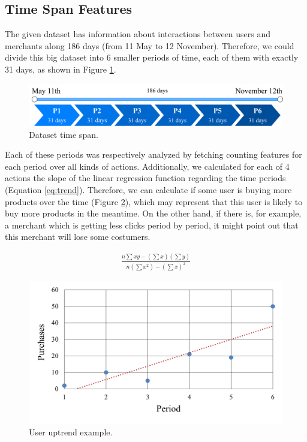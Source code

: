 \documentclass{article}
\begin{document}
\subsection{Time Span Features}

The given dataset has information about interactions between users and merchants along 186 days (from 11 May to 12 November). Therefore, we could divide this big dataset into 6 smaller periods of time, each of them with exactly 31 days, as shown in Figure \ref{fig:time}.

\begin{figure}[h!]
    \centering
    \includegraphics[width=0.9\linewidth]{figs/time.png}
    \vspace{0.1cm}
    \caption{Dataset time span.}
    \label{fig:time}
\end{figure}

Each of these periods was respectively analyzed by fetching counting features for each period over all kinds of actions. Additionally, we calculated for each of 4 actions the slope of the linear regression function regarding the time periods (Equation \ref{eq:trend}). Therefore, we can calculate if some user is buying more products over the time (Figure \ref{fig:user}), which may represent that this user is likely to buy more products in the meantime. On the other hand, if there is, for example, a merchant which is getting less clicks period by period, it might point out that this merchant will lose some costumers.

\begin{align} \label{eq:trend}
    \frac{n \sum x y - (\sum x) (\sum y)}{n (\sum x^2) - (\sum x)^2}
\end{align}

\begin{figure}[h!]
    \centering
    \includegraphics[width=0.65\linewidth]{figs/user.png}
    \caption{User uptrend example.}
    \label{fig:user}
\end{figure}
\end{document}
